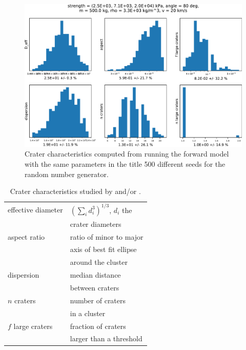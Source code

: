 \begin{figure}
    \centering
    \includegraphics[width=\textwidth]{figures/crater_tools_analysis_2}
    \caption{Crater characteristics computed from running the forward model with the same parameters in the title 500 different seeds for the random number generator.}
    \label{fig:characteristics_variability_2}
\end{figure}

\begin{table}[htbp]
    \centering
    \begin{tabular}{l|l}
        effective diameter & $\left(\sum_i d_i^3\right)^{1/3}$, $d_i$ the \\ & crater diameters \\[0.4em]
        aspect ratio & ratio of minor to major \\ & axis of best fit ellipse \\ & around the cluster \\[0.4em]
        dispersion & median distance \\ & between craters \\[0.4em]
        $n$ craters & number of craters \\ & in a cluster \\[0.4em]
        $f$ large craters & fraction of craters \\ & larger than a threshold
    \end{tabular}
    \caption{Crater characteristics studied by \cite{daubar2019recently} and/or \cite{newland2019CFM18}.}
    \label{tab:charcteristics}
\end{table}

